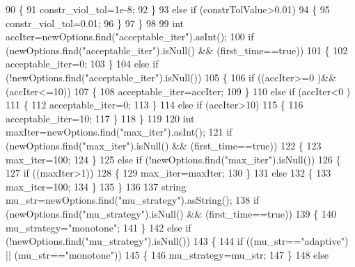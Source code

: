 \begin{DoxyCode}
90         \{
91             constr\_viol\_tol=1e-8;
92         \}
93         \textcolor{keywordflow}{else} \textcolor{keywordflow}{if} (constrTolValue>0.01)
94         \{
95             constr\_viol\_tol=0.01;
96         \}
97     \}
98 
99     \textcolor{keywordtype}{int} accIter=newOptions.find(\textcolor{stringliteral}{"acceptable\_iter"}).asInt();
100     \textcolor{keywordflow}{if} (newOptions.find(\textcolor{stringliteral}{"acceptable\_iter"}).isNull() && (first\_time==\textcolor{keyword}{true}))
101     \{
102         acceptable\_iter=0;
103     \}
104     \textcolor{keywordflow}{else} \textcolor{keywordflow}{if} (!newOptions.find(\textcolor{stringliteral}{"acceptable\_iter"}).isNull())
105     \{
106         \textcolor{keywordflow}{if} ((accIter>=0 )&& (accIter<=10))
107         \{
108              acceptable\_iter=accIter;
109         \}
110         \textcolor{keywordflow}{else} \textcolor{keywordflow}{if} (accIter<0 )
111         \{
112             acceptable\_iter=0;
113         \}
114         \textcolor{keywordflow}{else} \textcolor{keywordflow}{if} (accIter>10)
115         \{
116             acceptable\_iter=10;
117         \}
118     \}
119 
120     \textcolor{keywordtype}{int} maxIter=newOptions.find(\textcolor{stringliteral}{"max\_iter"}).asInt();
121     \textcolor{keywordflow}{if} (newOptions.find(\textcolor{stringliteral}{"max\_iter"}).isNull() && (first\_time==\textcolor{keyword}{true}))
122     \{
123         max\_iter=100;
124     \}
125     \textcolor{keywordflow}{else} \textcolor{keywordflow}{if} (!newOptions.find(\textcolor{stringliteral}{"max\_iter"}).isNull())
126     \{
127         \textcolor{keywordflow}{if} ((maxIter>1))
128         \{
129             max\_iter=maxIter;
130         \}
131         \textcolor{keywordflow}{else}
132         \{
133             max\_iter=100;
134         \}
135     \}
136 
137     \textcolor{keywordtype}{string} mu\_str=newOptions.find(\textcolor{stringliteral}{"mu\_strategy"}).asString();
138     \textcolor{keywordflow}{if} (newOptions.find(\textcolor{stringliteral}{"mu\_strategy"}).isNull() && (first\_time==\textcolor{keyword}{true}))
139     \{
140         mu\_strategy=\textcolor{stringliteral}{"monotone"};
141     \}
142     \textcolor{keywordflow}{else} \textcolor{keywordflow}{if} (!newOptions.find(\textcolor{stringliteral}{"mu\_strategy"}).isNull())
143     \{
144         \textcolor{keywordflow}{if} ((mu\_str==\textcolor{stringliteral}{"adaptive"}) || (mu\_str==\textcolor{stringliteral}{"monotone"}))
145         \{
146             mu\_strategy=mu\_str;
147         \}
148         \textcolor{keywordflow}{else}

\end{DoxyCode}
